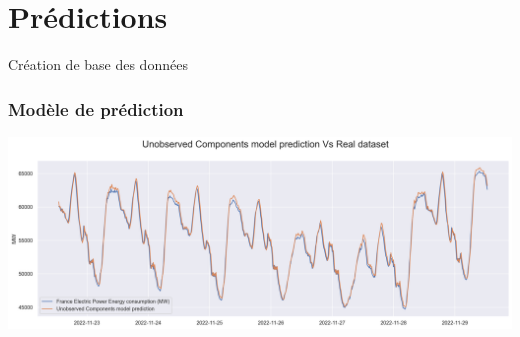 \documentclass[compress, red]{beamer}
\begin{document}
\section{Prédictions}

\begin{frame}{Création de base des données }
\begin{center}
\begin{overprint}
\hspace{-0.17em}


\end{overprint}
\end{center}
\end{frame}


\begin{frame}
\frametitle{Modèle de prédiction}
\includegraphics[scale=0.30]{images/output.png}

\end{frame}
\end{document}
